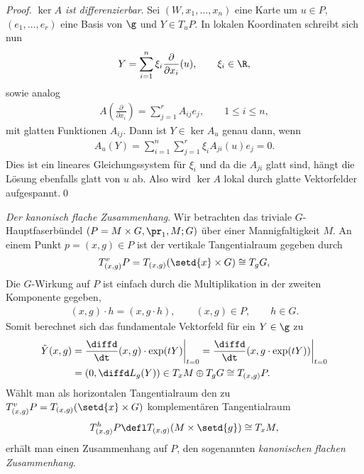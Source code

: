 \documentclass[%
	paper=a5,%
	fleqn,%
	DIV=18,%
	BCOR=0mm,
	fontsize=11pt,
	titlepage=false,%
	bibliography=totoc,
	DIV=18,%
	twoside=true,
	pdftitle=Riemannsche Geometrie,
	pdfauthor=Uwe Semmelmann,
	numbers=noendperiod]%
	{scrbook}
\begin{document}
\begin{proof}
\textit{$\ker A$ ist differenzierbar}. Sei $(W,x_1,\ldots,x_n)$ eine Karte um
$u\in P$, $(e_1,\ldots,e_r)$ eine Basis von $\g$ und $Y\in T_uP$. In lokalen
Koordinaten schreibt sich nun
\begin{align*}
Y = \sum_{i=1}^n \xi_i \frac{\partial}{\partial x_i}(u),\qquad \xi_i\in \R,
\end{align*}
sowie analog
\begin{align*}
A\left(\frac{\partial}{\partial x_i} \right) = 
\sum_{j=1}^r A_{ij} e_j,\qquad 1\le i\le n,
\end{align*}
mit glatten Funktionen $A_{ij}$. Dann ist $Y\in \ker A_u$ genau dann, wenn
\begin{align*}
A_u(Y) = \sum_{i=1}^n\sum_{j=1}^r \xi_i A_{ji}(u)e_j = 0. 
\end{align*}
Dies ist ein lineares Gleichungssystem für $\xi_i$ und da die $A_{ji}$ glatt
sind, hängt die Lösung ebenfalls glatt von $u$ ab. Also wird $\ker A$ lokal
durch glatte Vektorfelder aufgespannt.\qed
\end{proof}

\begin{ex}
\textit{Der kanonisch flache Zusammenhang}.
Wir betrachten das triviale $G$-Hauptfaserbündel $(P=M\times G,\pr_1,M;G)$ über
einer Mannigfaltigkeit $M$. An einem Punkt $p=(x,g)\in P$ ist der
vertikale Tangentialraum gegeben durch
\begin{align*}
T^v_{(x,g)}P = T_{(x,g)}(\setd{x}\times G) \cong T_gG,
\end{align*}
Die $G$-Wirkung auf $P$ ist einfach durch die
Multiplikation in der zweiten Komponente gegeben,
\begin{align*}
(x,g)\cdot h = (x,g\cdot h),\qquad (x,g)\in P,\qquad h\in G.
\end{align*}
Somit berechnet sich das fundamentale Vektorfeld für ein $Y\in \g$ zu
\begin{align*}
\tilde{Y}(x,g) &= \frac{\diffd}{\dt} (x,g)\cdot \exp(tY)\bigg|_{t=0}
= \frac{\diffd}{\dt} (x,g\cdot \exp(tY))\bigg|_{t=0}\\
&= (0,\diffd L_g(Y)) \in T_{x}M\oplus T_gG \cong T_{(x,g)}P.
\end{align*}
Wählt man als horizontalen Tangentialraum den zu $T^v_{(x,g)}P =
T_{(x,g)}(\setd{x}\times G)$ komplementären Tangentialraum
\begin{align*}
T^h_{(x,g)}P \defl T_{(x,g)}(M\times \setd{g}) \cong T_xM,
\end{align*}
erhält man einen Zusammenhang auf $P$, den sogenannten \emph{kanonischen
flachen Zusammenhang}.\bsp
\end{ex}
\end{document}
